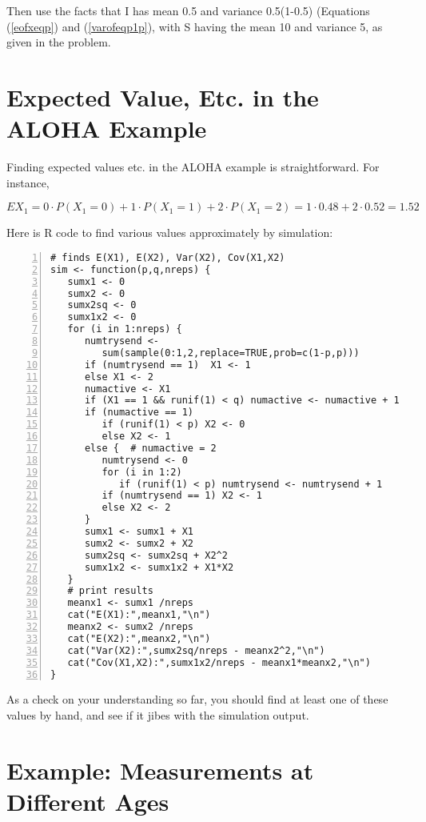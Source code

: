 Then use the facts that I has mean 0.5 and variance 0.5(1-0.5)
(Equations (\ref{eofxeqp}) and (\ref{varofeqp1p}), with S having the
mean 10 and variance 5, as given in the problem.

\section{Expected Value, Etc. in the ALOHA Example}

Finding expected values etc. in the ALOHA example is straightforward.
For instance, 

\begin{equation}
EX_1 = 0 \cdot P(X_1 = 0) + 1 \cdot P(X_1 = 1) + 2 \cdot P(X_1 = 2)
= 1 \cdot 0.48 + 2 \cdot 0.52 = 1.52
\end{equation}

Here is R code to find various values approximately by simulation:

\begin{Verbatim}[fontsize=\relsize{-2},numbers=left]
# finds E(X1), E(X2), Var(X2), Cov(X1,X2)
sim <- function(p,q,nreps) {
   sumx1 <- 0
   sumx2 <- 0
   sumx2sq <- 0
   sumx1x2 <- 0
   for (i in 1:nreps) {
      numtrysend <- 
         sum(sample(0:1,2,replace=TRUE,prob=c(1-p,p)))
      if (numtrysend == 1)  X1 <- 1
      else X1 <- 2
      numactive <- X1
      if (X1 == 1 && runif(1) < q) numactive <- numactive + 1
      if (numactive == 1)
         if (runif(1) < p) X2 <- 0
         else X2 <- 1
      else {  # numactive = 2
         numtrysend <- 0
         for (i in 1:2)
            if (runif(1) < p) numtrysend <- numtrysend + 1
         if (numtrysend == 1) X2 <- 1
         else X2 <- 2
      }
      sumx1 <- sumx1 + X1
      sumx2 <- sumx2 + X2
      sumx2sq <- sumx2sq + X2^2
      sumx1x2 <- sumx1x2 + X1*X2
   }
   # print results
   meanx1 <- sumx1 /nreps
   cat("E(X1):",meanx1,"\n")
   meanx2 <- sumx2 /nreps
   cat("E(X2):",meanx2,"\n")
   cat("Var(X2):",sumx2sq/nreps - meanx2^2,"\n")
   cat("Cov(X1,X2):",sumx1x2/nreps - meanx1*meanx2,"\n")
}
\end{Verbatim}

As a check on your understanding so far, you should find at least one of
these values by hand, and see if it jibes with the simulation output.

\section{Example:  Measurements at Different Ages}

